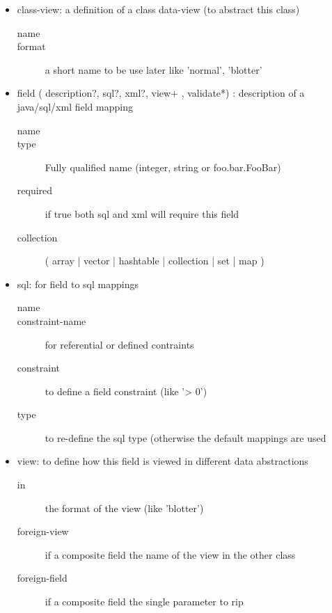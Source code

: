 \begin{itemize}
\item{class-view}: a definition of a class data-view (to abstract this
class)
\begin{description}
    \item[name]
    \item[format] a short name to be use later like 'normal', 'blotter'
\end{description}



\item{field ( description?, sql?, xml?, view+ , validate*)} : description of a java/sql/xml field mapping 
\begin{description}
    \item[name]
    \item[type] Fully qualified name (integer, string or foo.bar.FooBar)
    \item[required] if true both sql and xml will require this field
    \item[collection]    ( array | vector | hashtable | collection | set | map ) 
\end{description}

\item{sql}: for field to sql mappings
\begin{description}
    \item[name]
    \item[constraint-name] for referential or defined contraints
    \item[constraint] to define a field constraint (like '> 0')
    \item[type] to re-define the sql type (otherwise the default
mappings are used
\end{description}

\item{view}: to define how this field is viewed in different data abstractions
\begin{description}
    \item[in] the format of the view (like 'blotter')
    \item[foreign-view] if a composite field the name of the view in
the other class
	\item[foreign-field] if a composite field the single parameter to rip
\end{description}
 

\end{itemize}
